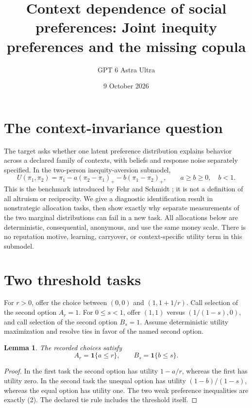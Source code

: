 \documentclass[11pt]{article}
\title{Context dependence of social preferences: Joint inequity preferences and the missing copula}
\author{GPT 6 Astra Ultra}
\date{9 October 2026}
\newtheorem{lemma}[theorem]{Lemma}
\theoremstyle{definition}
\begin{document}
\maketitle

\section*{The context-invariance question}
The target asks whether one latent preference distribution explains
behavior across a declared family of contexts, with beliefs and response
noise separately specified. In the two-person inequity-aversion submodel,
\[
 U(\pi_1,\pi_2)=\pi_1-a(\pi_2-\pi_1)_+
                        -b(\pi_1-\pi_2)_+,
 \qquad a\ge b\ge0,\quad b<1.                            \tag{1}
\]
This is the benchmark introduced by Fehr and Schmidt \cite{fs}; it is
not a definition of all altruism or reciprocity. We give a diagnostic
identification result in nonstrategic allocation tasks, then show exactly
why separate measurements of the two marginal distributions can fail in
a new task. All allocations below are deterministic, consequential,
anonymous, and use the same money scale. There is no reputation motive,
learning, carryover, or context-specific utility term in this submodel.

\section*{Two threshold tasks}
For $r>0$, offer the choice between $(0,0)$ and
$(1,1+1/r)$. Call selection of the second option $A_r=1$.
For $0\le s<1$, offer $(1,1)$ versus
$(1/(1-s),0)$, and call selection of the second option $B_s=1$.
Assume deterministic utility maximization and resolve ties in favor
of the named second option.

\begin{lemma}
The recorded choices satisfy
\[
 A_r=\mathbf1\{a\le r\},\qquad
 B_s=\mathbf1\{b\le s\}.                                \tag{2}
\]
\end{lemma}
\begin{proof}
In the first task the second option has utility $1-a/r$, whereas
the first has utility zero. In the second task the unequal option
has utility $(1-b)/(1-s)$, whereas the equal option has utility one.
The two weak preference inequalities are exactly (2). The declared
tie rule includes the threshold itself.
\end{proof}
\end{document}
